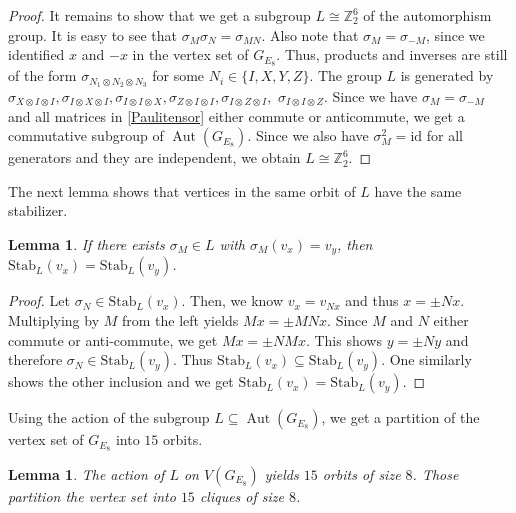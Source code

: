 \documentclass[11pt]{article}
\newtheorem{lemm}[theo]{Lemma}
\theoremstyle{definition}
\numberwithin{equation}{section}
\newcommand{\Z}{\mathbb{Z}}
\DeclareMathOperator{\aut}{Aut}
\begin{document}
\begin{proof}
It remains to show that we get a subgroup $L\cong \Z_2^6$ of the automorphism group. It is easy to see that $\sigma_M \sigma_N=\sigma_{MN}$. Also note that $\sigma_M=\sigma_{-M}$, since we identified $x$ and $-x$ in the vertex set of $G_{E_8}$. Thus, products and inverses are still of the form $\sigma_{N_1\otimes N_2\otimes N_3}$ for some $N_i \in \{I,X,Y,Z\}$. The group $L$ is generated by $\sigma_{X\otimes I\otimes I}, \sigma_{I\otimes X\otimes I},\sigma_{I\otimes I\otimes X},\sigma_{Z\otimes I\otimes I},\sigma_{I\otimes Z\otimes I},$ $\sigma_{I\otimes I\otimes Z}$. Since we have $\sigma_M=\sigma_{-M}$ and all matrices in \eqref{Paulitensor} either commute or anticommute, we get a commutative subgroup of $\aut(G_{E_8})$. Since we also have $\sigma_M^2=\mathrm{id}$ for all generators and they are independent, we obtain $L\cong \Z_2^6$.
\end{proof}

The next lemma shows that vertices in the same orbit of $L$ have the same stabilizer. 

\begin{lemm}\label{stabeq}
If there exists $\sigma_M\in L$ with $\sigma_M(v_x)=v_y$, then $\mathrm{Stab}_L(v_x)=\mathrm{Stab}_L(v_y)$.
\end{lemm}

\begin{proof}
Let $\sigma_N \in \mathrm{Stab}_L(v_x)$. Then, we know $v_x=v_{Nx}$ and thus $x =\pm Nx$. Multiplying by $M$ from the left yields $Mx=\pm MNx$. Since $M$ and $N$ either commute or anti-commute, we get $Mx=\pm NMx$. This shows $y=\pm Ny$ and therefore $\sigma_N \in \mathrm{Stab}_L(v_y)$. Thus $\mathrm{Stab}_L(v_x)\subseteq \mathrm{Stab}_L(v_y)$. One similarly shows the other inclusion and we get $\mathrm{Stab}_L(v_x)= \mathrm{Stab}_L(v_y)$.
\end{proof}

Using the action of the subgroup $L\subseteq \aut(G_{E_8})$, we get a partition of the vertex set of $G_{E_8}$ into $15$ orbits. 

\begin{lemm}
The action of $L$ on $V(G_{E_8})$ yields $15$ orbits of size $8$. Those partition the vertex set into $15$ cliques of size $8$. 
\end{lemm}
\end{document}
